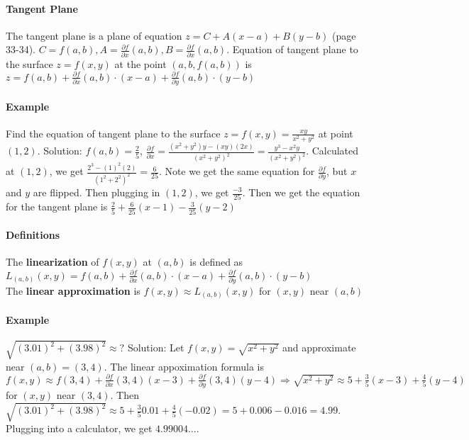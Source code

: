 \documentclass[tikz,10pt,letter]{article}
\theoremstyle{plain}
\theoremstyle{definition}
\begin{document}
\paragraph{Tangent Plane}
The tangent plane is a plane of equation $z=C+A(x-a)+B(y-b)$ (page 33-34). $C=f(a,b),A=\frac{\partial f}{\partial x}(a,b),B=\frac{\partial f}{\partial x}(a,b)$. Equation of tangent plane to the surface $z=f(x,y)$ at the point $(a,b,f(a,b))$ is $z=f(a,b)+\frac{\partial f}{\partial x}(a,b)\cdot(x-a)+\frac{\partial f}{\partial y}(a,b)\cdot(y-b)$  

\paragraph{Example}
Find the equation of tangent plane to the surface $z=f(x,y)=\frac{xy}{x^2+y^2}$ at point $(1,2)$. Solution: $f(a,b)=\frac{2}{5}$, $\frac{\partial f}{\partial x}=\frac{(x^2+y^2)y-(xy)(2x)}{(x^2+y^2)^2}=\frac{y^3-x^2y}{(x^2+y^2)^2}$. Calculated at $(1,2)$, we get $\frac{2^3-(1)^2(2)}{(1^2+2^2)^2}=\frac{6}{25}$. Note we get the same equation for $\frac{\partial f}{\partial y}$, but $x$ and $y$ are flipped. Then plugging in $(1,2)$, we get $\frac{-3}{25}$. Then we get the equation for the tangent plane is $\frac{2}{5}+\frac{6}{25}(x-1)-\frac{3}{25}(y-2)$ 

\paragraph{Definitions}
The \textbf{linearization} of $f(x,y)$ at $(a,b)$ is defined as $L_{(a,b)}(x,y)=f(a,b)+\frac{\partial f}{\partial x}(a,b)\cdot(x-a)+\frac{\partial f}{\partial y}(a,b)\cdot(y-b)$ \\ 
The \textbf{linear approximation} is $f(x,y)\approx L_{(a,b)}(x,y)$ for $(x,y)$ near $(a,b)$ 

\paragraph{Example}
$\sqrt{(3.01)^2+(3.98)^2}\approx?$ Solution: Let $f(x,y)=\sqrt{x^2+y^2}$ and approximate near $(a,b)=(3,4)$. The linear appoximation formula is $f(x,y)\approx f(3,4)+\frac{\partial f}{\partial x}(3,4)(x-3)+\frac{\partial f}{\partial y}(3,4)(y-4)\Rightarrow \sqrt{x^2+y^2}\approx5+\frac{3}{5}(x-3)+\frac{4}{5}(y-4)$ for $(x,y)$ near $(3,4)$. Then $\sqrt{(3.01)^2+(3.98)^2}\approx 5+ \frac{3}{5}0.01+\frac{4}{5}(-0.02)=5+0.006-0.016=4.99$. Plugging into a calculator, we get $4.99004\ldots$. 
\end{document}
